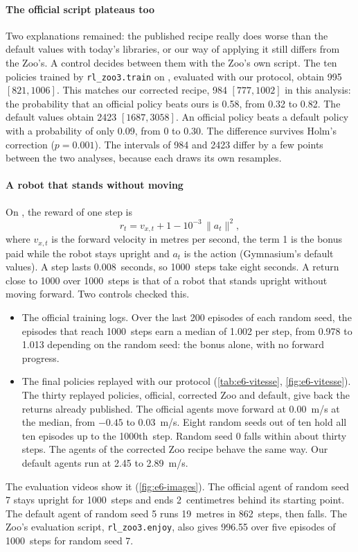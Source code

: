 \paragraph{The official script plateaus too}
Two explanations remained: the published recipe really does worse than the default values with today's
libraries, or our way of applying it still differs from the Zoo's. A control
decides between them with the Zoo's own script. The ten policies trained by
\texttt{rl\_zoo3.train} on , evaluated with our protocol, obtain \num{995}
$[821, \num{1006}]$. This matches our corrected recipe, \num{984} $[777, \num{1002}]$ in this analysis: the
probability that an official policy beats ours is 0.58, from 0.32 to 0.82. The default values obtain
\num{2423} $[\num{1687}, \num{3058}]$. An official policy beats a default policy with a probability of only
0.09, from 0 to 0.30. The difference survives Holm's correction ($p=0.001$). The intervals of \num{984} and
\num{2423} differ by a few points between the two analyses, because each draws its own resamples.

\paragraph{A robot that stands without moving}
On , the reward of one step is
\begin{equation}
  r_t = v_{x,t} + 1 - 10^{-3}\,\lVert a_t\rVert^2,
\end{equation}
where $v_{x,t}$ is the forward velocity in metres per second, the term 1 is the bonus paid while the robot
stays upright and $a_t$ is the action (Gymnasium's default values). A step lasts 0.008~seconds, so
\num{1000}~steps take eight seconds. A return close to \num{1000} over \num{1000}~steps is that of a robot
that stands upright without moving forward. Two controls checked
this.
\begin{itemize}
  \item The official training logs. Over the last 200 episodes of each random seed, the
    episodes that reach \num{1000}~steps earn a median of 1.002 per step, from 0.978 to 1.013 depending on the
    random seed: the bonus alone, with no forward progress.
  \item The final policies replayed with our protocol (\cref{tab:e6-vitesse},
    \cref{fig:e6-vitesse}). The thirty replayed policies, official, corrected Zoo and default, give back the
    returns already published. The official agents
    move forward at 0.00~m/s at the median, from $-0.45$ to 0.03~m/s. Eight random seeds out of ten hold all
    ten episodes up to the \num{1000}th~step. Random seed 0 falls within about thirty steps. The agents of the
    corrected Zoo recipe behave the same way. Our default agents run at 2.45 to 2.89~m/s.
\end{itemize}
The evaluation videos show it (\cref{fig:e6-images}). The official agent of random seed 7 stays upright for
\num{1000}~steps and ends 2~centimetres behind its starting point. The default agent of random seed 5 runs
19~metres in 862~steps, then falls. The Zoo's evaluation script, \texttt{rl\_zoo3.enjoy}, also gives
\num{996.55} over five episodes of \num{1000}~steps for random seed 7.

